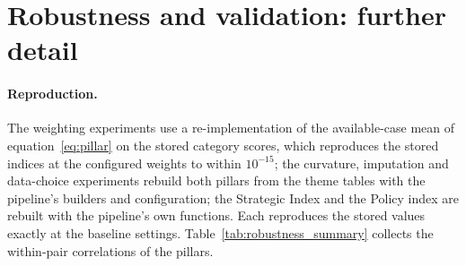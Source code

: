 \section{Robustness and validation: further detail}\label{oa:robustness}

\paragraph{Reproduction.} The weighting experiments use a re-implementation of the available-case
mean of equation~\eqref{eq:pillar} on the stored category scores, which reproduces the stored
indices at the configured weights to within $10^{-15}$; the curvature, imputation and data-choice
experiments rebuild both pillars from the theme tables with the pipeline's builders and
configuration; the Strategic Index and the Policy index are rebuilt with the pipeline's own
functions. Each reproduces the stored values exactly at the baseline settings.
Table~\ref{tab:robustness_summary} collects the within-pair correlations of the pillars.




